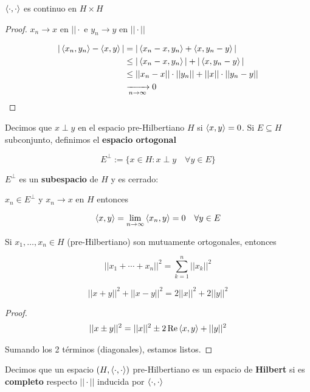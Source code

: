 \begin{fproposition}
    $\left\langle \cdot,\cdot\right\rangle$ es continuo en $H\times H$
\end{fproposition}

\begin{proof}
    $x_n\to x$ en $||\cdot$ e $y_n\to y$ en $||\cdot||$

    \begin{align*}
        |\left\langle x_n,y_n\right\rangle-\left\langle x,y\right\rangle|&=|\left\langle x_n-x,y_n\right\rangle+\left\langle x,y_n-y\right\rangle|\\
        &\leq |\left\langle x_n-x,y_n\right\rangle|+|\left\langle x,y_n-y\right\rangle|\\
        &\leq ||x_n-x||\cdot ||y_n||+||x||\cdot ||y_n-y||\\
        &\xrightarrow[n\to\infty]{} 0
    \end{align*}
\end{proof}

\begin{fdefinition}
    Decimos que $x\perp y$ en el espacio pre-Hilbertiano $H$ si $\left\langle x,y\right\rangle=0$. Si $E\subseteq H$ subconjunto, definimos el \textbf{espacio ortogonal}

    \[E^\perp :=\{x\in H:x\perp y\quad \forall y\in E\}\]
\end{fdefinition}

$E^\perp$ es un \textbf{subespacio} de $H$ y es cerrado:

$x_n\in E^\perp$ y $x_n\to x$ en $H$ entonces 

\[\left\langle x,y\right\rangle=\lim_{n\to\infty} \left\langle x_n,y\right\rangle=0\quad \forall y\in E\]

\begin{ftheorem}[Pitagoras]
    Si $x_1,\ldots,x_n\in H$ (pre-Hilbertiano) son mutuamente ortogonales, entonces 

    \[||x_1+\cdots+x_n||^2=\sum_{k=1}^n ||x_k||^2\]
\end{ftheorem}

\begin{fproposition}
    \[||x+y||^2+||x-y||^2=2||x||^2+2||y||^2\]
\end{fproposition}

\begin{proof}
    \begin{align*}
        ||x\pm y||^2=||x||^2\pm 2\operatorname{Re} \left\langle x,y\right\rangle+||y||^2
    \end{align*}

    Sumando los 2 términos (diagonales), estamos listos.
\end{proof}

\begin{fdefinition}
    Decimos que un espacio $(H,\left\langle \cdot,\cdot\right\rangle)$ pre-Hilbertiano es un espacio de \textbf{Hilbert} si es \textbf{completo} respecto $||\cdot||$ inducida por $\left\langle \cdot,\cdot\right\rangle$
\end{fdefinition}


